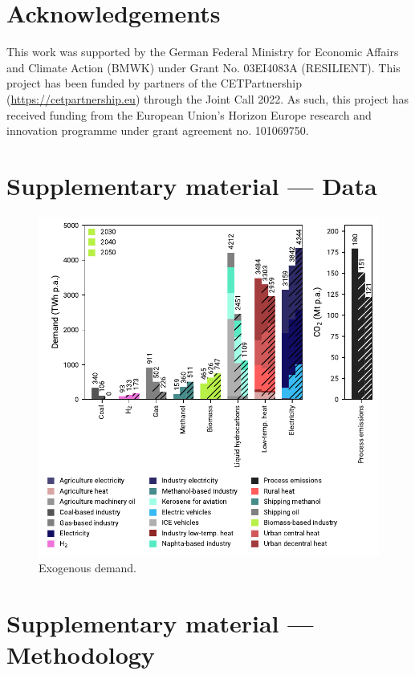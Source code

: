 \documentclass[preprint,12pt,sort&compress]{elsarticle}
\begin{document}
\section*{Acknowledgements}
This work was supported by the German Federal Ministry for Economic Affairs and Climate Action (BMWK) under Grant No. 03EI4083A (RESILIENT). This project has been funded by partners of the CETPartnership (\href{https://cetpartnership.eu}{https://cetpartnership.eu}) through the Joint Call 2022. As such, this project has received funding from the European Union's Horizon Europe research and innovation programme under grant agreement no. 101069750.


\newpage
\appendix

\section{Supplementary material --- Data}
\label{app:data}\begin{figure}[htbp]
  \centering
  \includegraphics[width=\textwidth]{exogenous_demand.pdf}
  \caption{Exogenous demand.}
  \label{fig:exogenous_demand}
\end{figure}

\clearpage
\section{Supplementary material --- Methodology}
\label{app:methodology}
\end{document}
